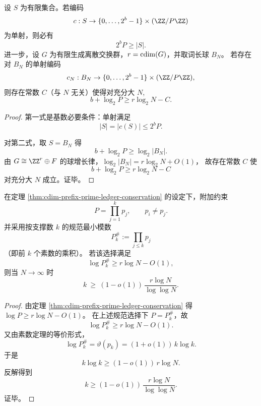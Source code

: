 \begin{theorem}[前缀--素数账本守恒不等式]\label{thm:cdim-prefix-prime-ledger-conservation}
设 \(S\) 为有限集合。若编码
\[
c:S\to\{0,\dots,2^b-1\}\times(\ZZ/P\ZZ)
\]
为单射，则必有
\[
2^bP\ge |S|.
\]
进一步，设 \(G\) 为有限生成离散交换群，\(r=\operatorname{cdim}(G)\)，并取词长球 \(B_N\)。
若存在对 \(B_N\) 的单射编码
\[
c_N:B_N\to\{0,\dots,2^b-1\}\times(\ZZ/P\ZZ),
\]
则存在常数 \(C\)（与 \(N\) 无关）使得对充分大 \(N\),
\[
b+\log_2 P\ge r\log_2 N-C.
\]
\end{theorem}
\begin{proof}
第一式是基数必要条件：单射满足
\[
|S|=|c(S)|\le 2^bP.
\]

对第二式，取 \(S=B_N\) 得
\[
b+\log_2 P\ge \log_2|B_N|.
\]
由 \(G\cong\ZZ^r\oplus F\) 的球增长律，\(\log_2|B_N|=r\log_2N+O(1)\)，
故存在常数 \(C\) 使
\[
b+\log_2 P\ge r\log_2N-C
\]
对充分大 \(N\) 成立。证毕。
\end{proof}

\begin{corollary}[平方自由素数账本下的支撑规模下界]\label{cor:cdim-squarefree-prime-support-growth}
在定理 \ref{thm:cdim-prefix-prime-ledger-conservation} 的设定下，附加约束
\[
P=\prod_{j=1}^{k}p_j,\qquad p_i\neq p_j.
\]
并采用按支撑数 \(k\) 的规范最小模数
\[
P_k^\#:=\prod_{j\le k}p_j
\]
（即前 \(k\) 个素数的乘积）。
若该选择满足
\[
\log P_k^\#\ge r\log N-O(1),
\]
则当 \(N\to\infty\) 时
\[
k\ \ge\ (1-o(1))\,\frac{r\log N}{\log\log N}.
\]
\end{corollary}
\begin{proof}
由定理 \ref{thm:cdim-prefix-prime-ledger-conservation} 得 \(\log P\ge r\log N-O(1)\)。
在上述规范选择下 \(P=P_k^\#\)，故
\[
\log P_k^\#\ge r\log N-O(1).
\]
又由素数定理的等价形式，
\[
\log P_k^\#=\vartheta(p_k)=(1+o(1))\,k\log k.
\]
于是
\[
k\log k\ge (1-o(1))\,r\log N.
\]
反解得到
\[
k\ge (1-o(1))\,\frac{r\log N}{\log\log N}.
\]
证毕。
\end{proof}

